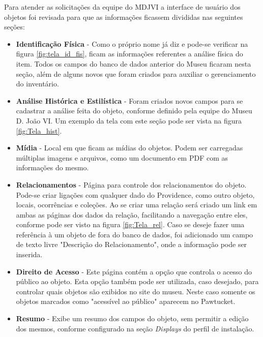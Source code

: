 \documentclass[a4paper,12pt,oneside,onecolumn,final,fleqn]{repUERJ}
\begin{document}
Para atender as solicitações da equipe do MDJVI a interface de usuário dos objetos foi revisada para que as informações ficassem divididas nas seguintes seções: 

\begin{itemize}
	\item \textbf{Identificação Física} - Como o próprio nome já diz e pode-se verificar na figura \ref{fig:tela_id_fis},  ficam as informações referentes a análise física do item. Todos os campos do banco de dados anterior do Museu ficaram nesta seção, além de alguns novos que foram criados para auxiliar o gerenciamento do inventário.
	\item \textbf{Análise Histórica e Estilística} - Foram criados novos campos para se cadastrar a análise feita do objeto, conforme definido pela equipe do Museu D. João VI. Um exemplo da tela com este seção pode ser vista na figura \ref{fig:Tela_hist}. 
	\item \textbf{Mídia} - Local em que ficam as mídias do objetos. Podem ser carregadas múltiplas imagens e arquivos, como um documento em PDF com as informações do mesmo.
	\item \textbf{Relacionamentos} - Página para controle dos relacionamentos do objeto. Pode-se criar ligações com qualquer dado do Providence, como outro objeto, locais, ocorrências e coleções. Ao se criar uma relação será criado um link em ambas as páginas dos dados da relação, facilitando a navegação entre eles, conforme pode ser visto na figura \ref{fig:Tela_rel}. Caso se deseje fazer uma referência à um objeto de fora do banco de dados, foi adicionado um campo de texto livre "Descrição do Relacionamento", onde a informação pode ser inserida.
	\item \textbf{Direito de Acesso} - Este página contém a opção que controla o acesso do público ao objeto. Esta opção também pode ser utilizada, caso desejado, para controlar quais objetos são exibidos no site do museu. Neste caso somente os objetos marcados como "acessível ao público" aparecem no Pawtucket.
	\item \textbf{Resumo} - Exibe um resumo dos campos do objeto, sem permitir a edição dos mesmos, conforme configurado na seção \textit{Displays} do perfil de instalação.
\end{itemize}
\end{document}
